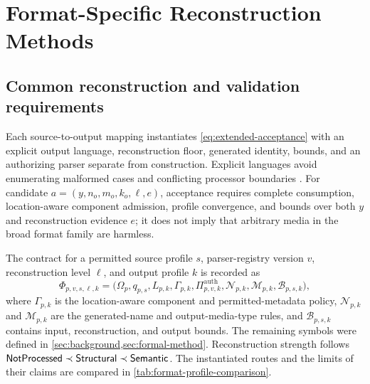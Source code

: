 \section{Format-Specific Reconstruction Methods}\label{sec:format-methods}

\subsection{Common reconstruction and validation requirements}
\label{subsec:format-common}

Each source-to-output mapping instantiates \cref{eq:extended-acceptance} with an
explicit output language, reconstruction floor, generated identity, bounds, and
an authorizing parser separate from construction. Explicit languages avoid
enumerating malformed cases and conflicting processor boundaries
\cite{momot2016,nail2014,jana2012,ipg2023}. For candidate
\(a=(y,n_o,m_o,k_o,\ell,e)\), acceptance requires complete consumption,
location-aware component admission, profile convergence, and bounds over both
\(y\) and reconstruction evidence \(e\); it does not imply that arbitrary media
in the broad format family are harmless.

The contract for a permitted source profile \(s\), parser-registry version
\(v\), reconstruction level \(\ell\), and output profile \(k\) is recorded as
\begin{equation}
 \Phi_{p,v,s,\ell,k}=
 \bigl(\Omega_p,q_{p,s},L_{p,k},\Gamma_{p,k},
       \Pi^{\mathrm{auth}}_{p,v,k},
       \mathcal{N}_{p,k},\mathcal{M}_{p,k},
       \mathcal{B}_{p,s,k}\bigr),
 \label{eq:format-profile-tuple}
\end{equation}
where \(\Gamma_{p,k}\) is the location-aware component and permitted-metadata
policy, \(\mathcal{N}_{p,k}\) and \(\mathcal{M}_{p,k}\) are the generated-name
and output-media-type rules, and \(\mathcal{B}_{p,s,k}\) contains input,
reconstruction, and output bounds. The remaining symbols were defined in
\cref{sec:background,sec:formal-method}. Reconstruction strength follows
\(\mathsf{NotProcessed}\prec\mathsf{Structural}\prec\mathsf{Semantic}\). The instantiated routes and
the limits of their claims are compared in
\cref{tab:format-profile-comparison}.

